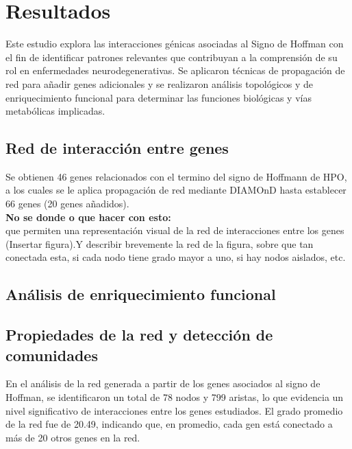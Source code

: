 \section{Resultados}

Este estudio explora las interacciones génicas asociadas al Signo de Hoffman con el fin de identificar patrones relevantes que contribuyan a la comprensión de su rol en enfermedades neurodegenerativas. Se aplicaron técnicas de propagación de red para añadir genes adicionales y se realizaron análisis topológicos y de enriquecimiento funcional para determinar las funciones biológicas y vías metabólicas implicadas.

\subsection{Red de interacción entre genes}


Se obtienen 46 genes relacionados con el termino del signo de Hoffmann de HPO, a los cuales se le aplica propagación de red mediante DIAMOnD hasta establecer 66 genes (20 genes añadidos).
\\

\textbf{No se donde o que hacer con esto:}\\

 que permiten una representación visual de la red de interacciones entre los genes (Insertar figura).Y describir brevemente la red de la figura, sobre que tan conectada esta, si cada nodo tiene grado mayor a uno, si hay nodos aislados, etc.

\subsection{Análisis de enriquecimiento funcional}

\subsection{Propiedades de la red y detección de comunidades}

En el análisis de la red generada a partir de los genes asociados al signo de Hoffman, se identificaron un total de 78 nodos y 799 aristas, lo que evidencia un nivel significativo de interacciones entre los genes estudiados. El grado promedio de la red fue de 20.49, indicando que, en promedio, cada gen está conectado a más de 20 otros genes en la red.

